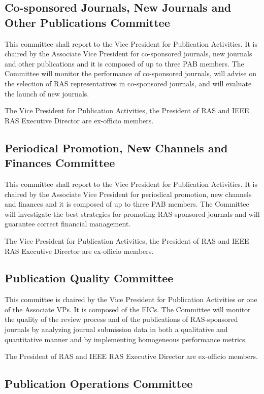 \documentclass[10pt]{article}
\begin{document}
\subsection{Co-sponsored Journals, New Journals and Other Publications Committee}

This committee shall report to the Vice President for Publication Activities. It is chaired by the Associate Vice President for co-sponsored journals, new journals and other publications and it is composed of up to three PAB members. The Committee will monitor the performance of co-sponsored journals, will advise on the selection of RAS representatives in co-sponsored journals, and will evaluate the launch of new journals. 

The Vice President for Publication Activities, the President of RAS and IEEE RAS Executive Director are ex-officio members.


\subsection{Periodical Promotion, New Channels and Finances Committee}

This committee shall report to the Vice President for Publication Activities. It is chaired by the Associate Vice President for periodical promotion, new channels and finances and it is composed of up to three PAB members. The Committee will investigate the best strategies for promoting RAS-sponsored journals and will guarantee correct financial management.

The Vice President for Publication Activities, the President of RAS and IEEE RAS Executive Director are ex-officio members.


\subsection{Publication Quality Committee}

This committee is chaired by the Vice President for Publication Activities or one of the Associate VPs. It is composed of the EICs. The Committee will monitor the quality of the review process and of the publications of RAS-sponsored journals by analyzing journal submission data in both a qualitative and quantitative manner and by implementing homogeneous performance metrics.

The President of RAS and IEEE RAS Executive Director are ex-officio members.



\subsection{Publication Operations Committee}
\end{document}
